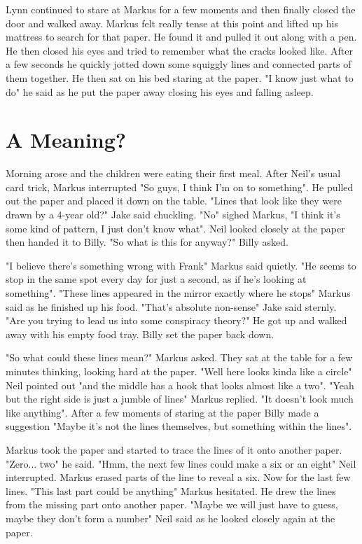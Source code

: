 \documentclass[12pt]{book}
\begin{document}
Lynn continued to stare at Markus for a few moments and then finally closed the door and walked away. Markus felt really tense at this point and lifted up his mattress to search for that paper. He found it and pulled it out along with a pen. He then closed his eyes and tried to remember what the cracks looked like. After a few seconds he quickly jotted down some squiggly lines and connected parts of them together. He then sat on his bed staring at the paper. "I know just what to do" he said as he put the paper away closing his eyes and falling asleep.

\chapter{A Meaning?}

Morning arose and the children were eating their first meal. After Neil's usual card trick, Markus interrupted "So guys, I think I'm on to something". He pulled out the paper and placed it down on the table. "Lines that look like they were drawn by a 4-year old?" Jake said chuckling. "No" sighed Markus, "I think it's some kind of pattern, I just don't know what". Neil looked closely at the paper then handed it to Billy. "So what is this for anyway?" Billy asked.

"I believe there's something wrong with Frank" Markus said quietly. "He seems to stop in the same spot every day for just a second, as if he's looking at something". "These lines appeared in the mirror exactly where he stops" Markus said as he finished up his food. "That's absolute non-sense" Jake said sternly. "Are you trying to lead us into some conspiracy theory?" He got up and walked away with his empty food tray. Billy set the paper back down.

"So what could these lines mean?" Markus asked. They sat at the table for a few minutes thinking, looking hard at the paper. "Well here looks kinda like a circle" Neil pointed out "and the middle has a hook that looks almost like a two". "Yeah but the right side is just a jumble of lines" Markus replied. "It doesn't look much like anything". After a few moments of staring at the paper Billy made a suggestion "Maybe it's not the lines themselves, but something within the lines".

Markus took the paper and started to trace the lines of it onto another paper. "Zero... two" he said. "Hmm, the next few lines could make a six or an eight" Neil interrupted. Markus erased parts of the line to reveal a six. Now for the last few lines. "This last part could be anything" Markus hesitated. He drew the lines from the missing part onto another paper. "Maybe we will just have to guess, maybe they don't form a number" Neil said as he looked closely again at the paper.
\end{document}
